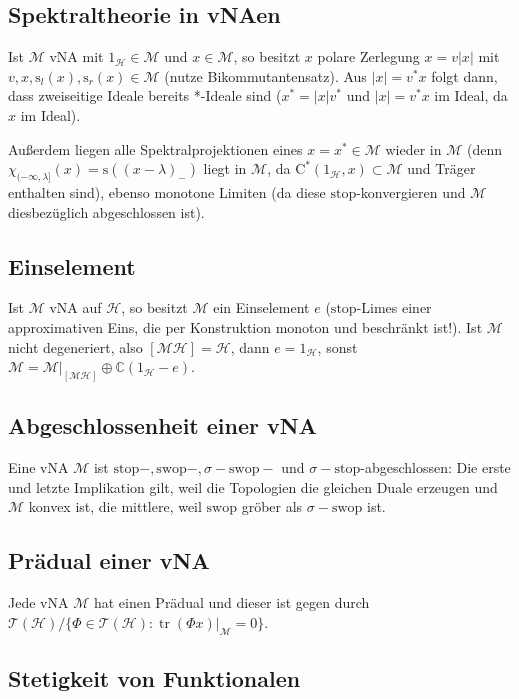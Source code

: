 \documentclass[11pt,a4paper]{scrartcl}
\newcommand{\C}{\mathbb{C}} %
\newcommand{\Hc}{\mathcal{H}}
\newcommand{\M}{\mathcal{M}}
\newcommand{\T}{\mathcal{T}}
\theoremstyle{plain}
\theoremstyle{definition}
\theoremstyle{remark}
\DeclareMathOperator{\tr}{tr}
\begin{document}
\subsection{Spektraltheorie in vNAen}

Ist $\M$ vNA mit $1_\Hc \in \M$ und $x\in \M$, so besitzt $x$ polare Zerlegung $x=v|x|$ mit $v,x,\mathrm{s}_l(x),\mathrm{s}_r(x)\in \M$ (nutze Bikommutantensatz). Aus $|x|=v^*x$ folgt dann, dass zweiseitige Ideale bereits *-Ideale sind ($x^*=|x|v^*$ und $|x|=v^*x$ im Ideal, da $x$ im Ideal).

Außerdem liegen alle Spektralprojektionen eines $x=x^*\in \M$ wieder in $\M$ (denn $\chi_{(-\infty, \lambda]}(x)=\mathrm{s}((x-\lambda)_{-})$ liegt in $\M$, da $\mathrm{C}^*(1_\Hc, x) \subset \M$ und Träger enthalten sind), ebenso monotone Limiten (da diese $\mathrm{stop}$-konvergieren und $\M$ diesbezüglich abgeschlossen ist).

\subsection{Einselement}

Ist $\M$ vNA auf $\Hc$, so besitzt $\M$ ein Einselement $e$ ($\mathrm{stop}$-Limes einer approximativen Eins, die per Konstruktion monoton und beschränkt ist!). Ist $\M$ nicht degeneriert, also $[\M\Hc]=\Hc$, dann $e=1_\Hc$, sonst $\M=\M|_{[\M\Hc]}\oplus \C (1_\Hc-e)$.

\subsection{Abgeschlossenheit einer vNA}

Eine vNA $\M$ ist $\mathrm{stop}-,\mathrm{swop}-,\sigma-\mathrm{swop}-$ und $\sigma-\mathrm{stop}$-abgeschlossen: Die erste und letzte Implikation gilt, weil die Topologien die gleichen Duale erzeugen und $\M$ konvex ist, die mittlere, weil $\mathrm{swop}$ gröber als $\sigma-\mathrm{swop}$ ist.

\subsection{Prädual einer vNA}

Jede vNA $\M$ hat einen Prädual und dieser ist gegen durch $\T(\Hc)/\{\Phi\in \T(\Hc): \tr(\Phi x)|_\M = 0 \}$.

\subsection{Stetigkeit von Funktionalen}
\end{document}
